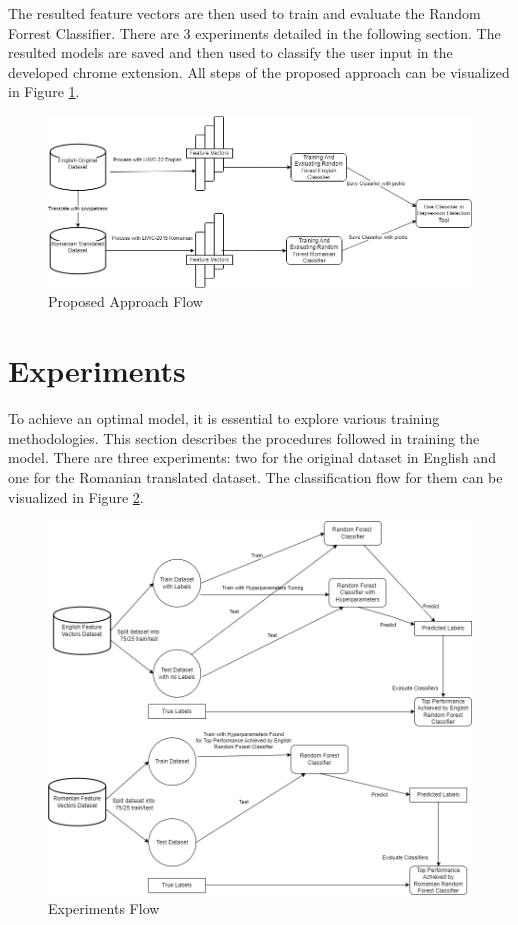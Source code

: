 The resulted feature vectors are then used to train and evaluate the Random Forrest Classifier. There are 3 experiments detailed in the following section. The resulted models are saved and then used to classify the user input in the developed chrome extension. All steps of the proposed approach can be visualized in Figure \ref{proposedApproachFlow}.

\begin{figure}[htbp]
	\centering
		\includegraphics[scale=0.47]{LaTeX Bachelor Thesis Depression Signs Detection/figures/FlowModelWhite.png}
	\caption{Proposed Approach Flow}
	\label{proposedApproachFlow}
\end{figure}


\section{Experiments}

\quad To achieve an optimal model, it is essential to explore various training methodologies. This section describes the procedures followed in training the model. There are three experiments: two for the original dataset in English and one for the Romanian translated dataset. The classification flow for them can be visualized in Figure \ref{experimentsFlow}.

\begin{figure}[htbp]
	\centering
		\includegraphics[scale=0.5]{LaTeX Bachelor Thesis Depression Signs Detection/figures/ClassificationFlowWhite.drawio (1).png}
	\caption{Experiments Flow}
	\label{experimentsFlow}
\end{figure}

